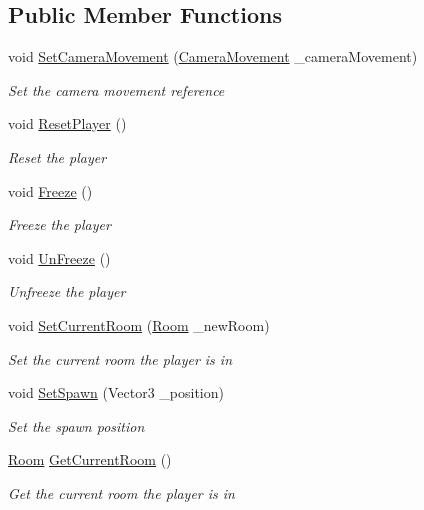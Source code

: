 \subsection*{Public Member Functions}
\begin{DoxyCompactItemize}
\item 
void \mbox{\hyperlink{class_player_ae4848921e3458e9d0a2cde5acb63e165}{Set\+Camera\+Movement}} (\mbox{\hyperlink{class_camera_movement}{Camera\+Movement}} \+\_\+camera\+Movement)
\begin{DoxyCompactList}\small\item\em Set the camera movement reference \end{DoxyCompactList}\item 
void \mbox{\hyperlink{class_player_a89c5345d4267bf7902531407fe50c61e}{Reset\+Player}} ()
\begin{DoxyCompactList}\small\item\em Reset the player \end{DoxyCompactList}\item 
void \mbox{\hyperlink{class_player_a8e3a84181da3b91573fb395fb8821a90}{Freeze}} ()
\begin{DoxyCompactList}\small\item\em Freeze the player \end{DoxyCompactList}\item 
void \mbox{\hyperlink{class_player_a7a222872698adba22fbd3c90302cc8ca}{Un\+Freeze}} ()
\begin{DoxyCompactList}\small\item\em Unfreeze the player \end{DoxyCompactList}\item 
void \mbox{\hyperlink{class_player_a24f8aeed0a7bb4dc8d2dcceea07dcaf7}{Set\+Current\+Room}} (\mbox{\hyperlink{class_level_generation_1_1_room}{Room}} \+\_\+new\+Room)
\begin{DoxyCompactList}\small\item\em Set the current room the player is in \end{DoxyCompactList}\item 
void \mbox{\hyperlink{class_player_a425c47ab72a45262765b2d60b6636911}{Set\+Spawn}} (Vector3 \+\_\+position)
\begin{DoxyCompactList}\small\item\em Set the spawn position \end{DoxyCompactList}\item 
\mbox{\hyperlink{class_level_generation_1_1_room}{Room}} \mbox{\hyperlink{class_player_ac4bbf69d383242cbf6807fdd28ee0f0d}{Get\+Current\+Room}} ()
\begin{DoxyCompactList}\small\item\em Get the current room the player is in \end{DoxyCompactList}\end{DoxyCompactItemize}
